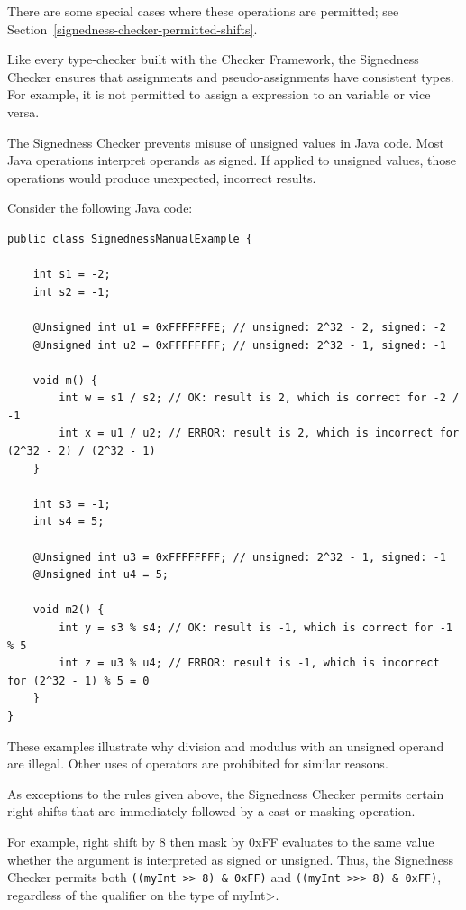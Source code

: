 There are some special cases where these operations are permitted; see
Section~\ref{signedness-checker-permitted-shifts}.

Like every type-checker built with the Checker Framework, the Signedness
Checker ensures that assignments and pseudo-assignments have consistent types.
For example, it is not permitted to assign a  expression to an
 variable or vice versa.



The Signedness Checker prevents misuse of unsigned values in Java code.
Most Java operations interpret operands as signed.  If applied to unsigned
values, those operations would produce unexpected, incorrect results.

Consider the following Java code:

\begin{Verbatim}
public class SignednessManualExample {

    int s1 = -2;
    int s2 = -1;

    @Unsigned int u1 = 0xFFFFFFFE; // unsigned: 2^32 - 2, signed: -2
    @Unsigned int u2 = 0xFFFFFFFF; // unsigned: 2^32 - 1, signed: -1

    void m() {
        int w = s1 / s2; // OK: result is 2, which is correct for -2 / -1
        int x = u1 / u2; // ERROR: result is 2, which is incorrect for (2^32 - 2) / (2^32 - 1)
    }

    int s3 = -1;
    int s4 = 5;

    @Unsigned int u3 = 0xFFFFFFFF; // unsigned: 2^32 - 1, signed: -1
    @Unsigned int u4 = 5;

    void m2() {
        int y = s3 % s4; // OK: result is -1, which is correct for -1 % 5
        int z = u3 % u4; // ERROR: result is -1, which is incorrect for (2^32 - 1) % 5 = 0
    }
}
\end{Verbatim}

These examples illustrate why division and modulus with an unsigned operand
are illegal.  Other uses of operators are prohibited for similar reasons.



As exceptions to the rules given above, the Signedness Checker permits
certain right shifts that are immediately followed by a cast or
masking operation.

For example, right shift by 8 then mask by 0xFF evaluates to the same value
whether the argument is interpreted as signed or unsigned.  Thus, the
Signedness Checker permits both \verb|((myInt >> 8) & 0xFF)| and
\verb|((myInt >>> 8) & 0xFF)|, regardless of the qualifier on the type of
\<myInt>.

